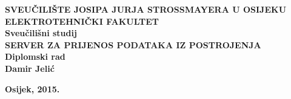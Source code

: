 \newpage
\begin{titlepage}
\begin{center}

\textbf{\MakeUppercase{\large
    Sveučilište Josipa Jurja Strossmayera u Osijeku}}\\[0.2cm]

\textbf{\MakeUppercase{\large Elektrotehnički fakultet}}\\[0.8cm]
\textbf{\large Sveučilišni studij}\\ [5cm]

\textbf{\MakeUppercase{\Large
    Server za prijenos podataka iz postrojenja }}\\ [1cm]

\textbf{\large Diplomski rad}\\  [5 cm]

\textbf{\Large Damir Jelić}\\ [0.5cm]

\vfill

\textbf{\large Osijek, 2015.} \\

\end{center}
\end{titlepage}
